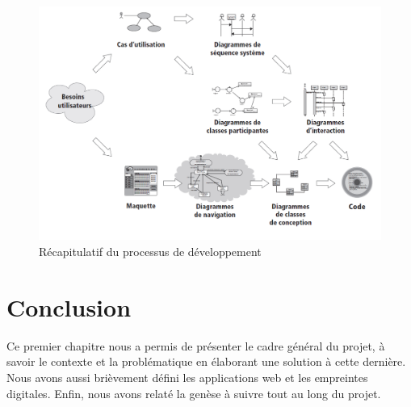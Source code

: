        

    \begin{figure}[h!]
      \centering
      \includegraphics[width=12cm]{images/processus_dev.png}
      \vspace{-10pt}
      \caption{Récapitulatif du processus de développement \cite{5}}
      \label{fig1}
    \end{figure}
\vspace{-30pt}
\section{Conclusion}
    Ce premier chapitre nous a permis de présenter le cadre général du projet, à savoir le contexte et la problématique en élaborant une solution à cette dernière. Nous avons aussi brièvement défini les applications web et les empreintes digitales. Enfin, nous avons relaté la genèse à suivre tout au long du projet.
    

